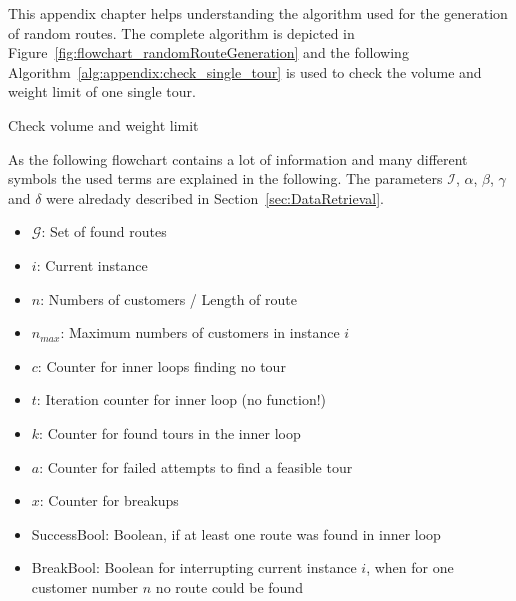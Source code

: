 This appendix chapter helps understanding the algorithm used for the generation of random routes. The complete algorithm
is depicted in Figure~\ref{fig:flowchart_randomRouteGeneration} and the following Algorithm~\ref{alg:appendix:check_single_tour}
is used to check the volume and weight limit of one single tour.
\begin{algorithm}[ht]
    \caption{Check volume and weight limit}
    \label{alg:appendix:check_single_tour}
    \begin{algorithmic}[1]\onehalfspacing
         
         
        \Else
        \EndIf
        \EndProcedure
    \end{algorithmic}
\end{algorithm}

As the following flowchart contains a lot of information and many different symbols the used terms are explained in
the following. The parameters $\mathcal{I}$, $\alpha$, $\beta$, $\gamma$ and $\delta$ were alredady described in
Section~\ref{sec:DataRetrieval}.

\begin{itemize}\singlespacing
    \item $\mathcal{G}$: Set of found routes
    \item $i$: Current instance
    \item $n$: Numbers of customers / Length of route
    \item $n_{max}$: Maximum numbers of customers in instance $i$
    \item $c$: Counter for inner loops finding no tour
    \item $t$: Iteration counter for inner loop (no function!)
    \item $k$: Counter for found tours in the inner loop
    \item $a$: Counter for failed attempts to find a feasible tour
    \item $x$: Counter for breakups
    \item SuccessBool: Boolean, if at least one route was found in inner loop
    \item BreakBool: Boolean for interrupting current instance $i$, when for one customer number $n$ no route could be found
\end{itemize}



